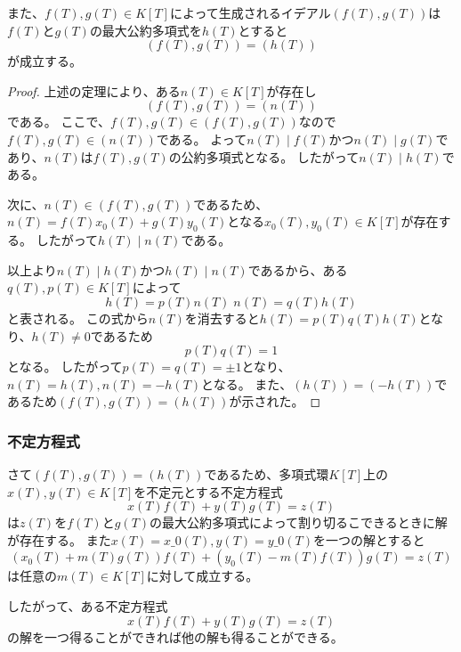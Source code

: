 \documentclass[uplatex, 11pt, a4j, dvipdfmx]{jsarticle}
\begin{document}
    また、$f(T), g(T) \in K[T]$によって生成されるイデアル$(f(T), g(T))$は$f(T)$と$g(T)$の最大公約多項式を$h(T)$とすると
    \begin{equation}
      (f(T), g(T)) = (h(T))
    \end{equation}
    が成立する。
    \begin{proof}
      上述の定理により、ある$n(T) \in K[T]$が存在し
      \begin{equation}
       (f(T), g(T)) = (n(T))
      \end{equation}
      である。
      ここで、$f(T), g(T) \in (f(T), g(T))$なので$f(T), g(T) \in (n(T))$である。
      よって$n(T) \mid f(T)$かつ$n(T) \mid g(T)$であり、$n(T)$は$f(T), g(T)$の公約多項式となる。
      したがって$n(T) \mid h(T)$である。

      次に、$n(T) \in (f(T), g(T))$であるため、$n(T) = f(T) x_0(T) + g(T) y_0(T)$となる$x_0(T), y_0(T) \in K[T]$が存在する。
      したがって$h(T) \mid n(T)$である。

      以上より$n(T) \mid h(T)$かつ$h(T) \mid n(T)$であるから、ある$q(T), p(T) \in K[T]$によって
      \begin{equation}
        h(T) = p(T) n(T) \; n(T) = q(T) h(T)
      \end{equation}
      と表される。
      この式から$n(T)$を消去すると$h(T) = p(T) q(T) h(T)$となり、$h(T) \neq 0$であるため
      \begin{equation}
        p(T) q(T) = 1
      \end{equation}
      となる。
      したがって$p(T) = q(T) = \pm 1$となり、$n(T) = h(T), n(T) = -h(T)$となる。
      また、$(h(T)) = (-h(T))$であるため$(f(T), g(T)) = (h(T))$が示された。
    \end{proof}


    \subsubsection{不定方程式}
      さて$(f(T), g(T)) = (h(T))$であるため、多項式環$K[T]$上の$x(T), y(T) \in K[T]$を不定元とする不定方程式
      \begin{equation}
        x(T) f(T) + y(T) g(T) = z(T)
      \end{equation}
      は$z(T)$を$f(T)$と$g(T)$の最大公約多項式によって割り切るこできるときに解が存在する。
      また$x(T) = x\_0(T), y(T) = y\_0(T)$を一つの解とすると
      \begin{equation}
        (x_0(T) + m(T) g(T)) f(T) + (y_0(T) - m(T) f(T)) g(T) = z(T)
      \end{equation}
      は任意の$m(T) \in K[T]$に対して成立する。

      したがって、ある不定方程式
      \begin{equation}
        x(T) f(T) + y(T) g(T) = z(T)
      \end{equation}
      の解を一つ得ることができれば他の解も得ることができる。
\end{document}
